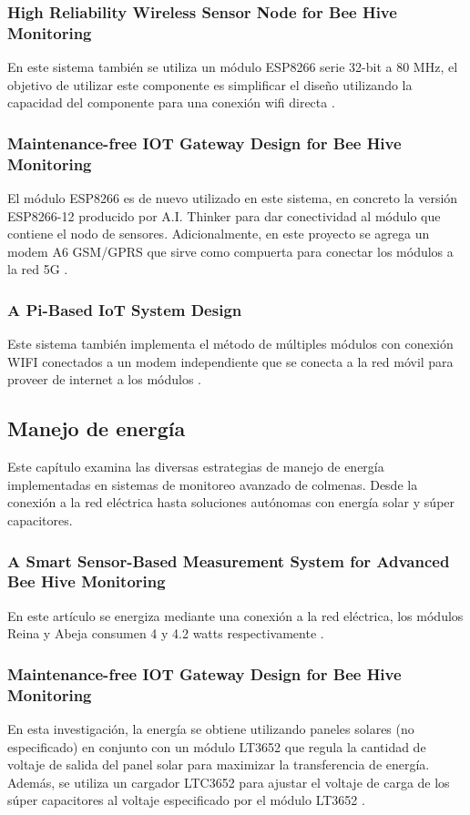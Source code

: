 \documentclass[journal]{IEEEtran} %
\begin{document}
\subsubsection{High Reliability Wireless Sensor Node for Bee Hive Monitoring}
En este sistema también se utiliza un módulo ESP8266 serie 32-bit a 80 MHz, el objetivo de utilizar este componente es simplificar el diseño utilizando la capacidad del componente para una conexión wifi directa \cite{Vidrascu2016HighMonitoring}.
\subsubsection{Maintenance-free IOT Gateway Design for Bee Hive Monitoring}
El módulo ESP8266 es de nuevo utilizado en este sistema, en concreto la versión ESP8266-12\cite{ModuloESP-12E} producido por A.I. Thinker para dar conectividad al módulo que contiene el nodo de sensores. Adicionalmente, en este proyecto se agrega un modem A6 GSM/GPRS \cite{THIDOA6} que sirve como compuerta para conectar los módulos a la red 5G \cite{Vidrascu2017Maintenance-freeMonitoring}.
\subsubsection{A Pi-Based IoT System Design}
Este sistema también implementa el método de múltiples módulos con conexión WIFI conectados a un modem independiente que se conecta a la red móvil para proveer de internet a los módulos \cite{Chen2020ADesign}.
\subsection{Manejo de energía}
Este capítulo examina las diversas estrategias de manejo de energía implementadas en sistemas de monitoreo avanzado de colmenas. Desde la conexión a la red eléctrica hasta soluciones autónomas con energía solar y súper capacitores. 
\subsubsection{A Smart Sensor-Based Measurement System for Advanced Bee Hive Monitoring }
En este artículo se energiza mediante una conexión a la red eléctrica, los módulos Reina y Abeja consumen 4 y 4.2 watts respectivamente \cite{Cecchi2020AMonitoring}.
\subsubsection{Maintenance-free IOT Gateway Design for Bee Hive Monitoring}
En esta investigación, la energía se obtiene utilizando paneles solares (no especificado) en conjunto con un módulo LT3652\cite{LT3652Devices} que regula la cantidad de voltaje de salida del panel solar para maximizar la transferencia de energía. Además, se utiliza un cargador LTC3652\cite{LTC3652Technology} para ajustar el voltaje de carga de los súper capacitores al voltaje especificado por el módulo LT3652 \cite{Vidrascu2017Maintenance-freeMonitoring}.
\end{document}
